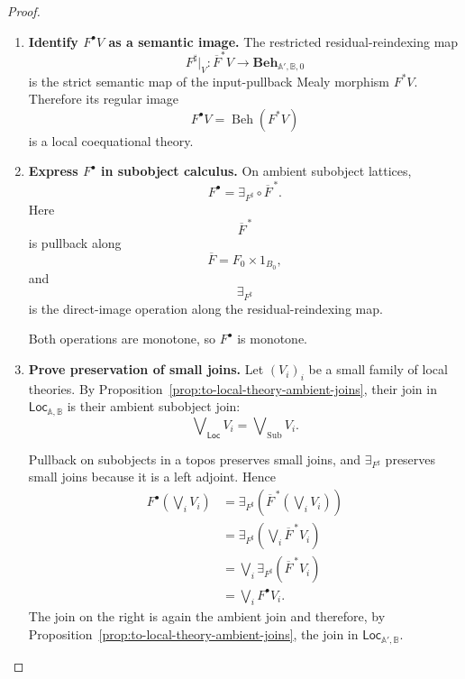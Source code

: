 \begin{proof}
    \leavevmode
    \begin{enumerate}
        \item \textbf{Identify \(F^\bullet V\) as a semantic image.}
        The restricted residual-reindexing map
        \[
            F^\sharp|_V:
            \overline F^*V
            \to
            \mathbf{Beh}_{\mathbb A',\mathbb B,0}
        \]
        is the strict semantic map of the input-pullback Mealy morphism
        \(F^*V\). Therefore its regular image
        \[
            F^\bullet V
            =
            \operatorname{Beh}(F^*V)
        \]
        is a local coequational theory.

        \item \textbf{Express \(F^\bullet\) in subobject calculus.}
        On ambient subobject lattices,
        \[
            F^\bullet
            =
            \exists_{F^\sharp}
            \circ
            \overline F^{\,*}.
        \]
        Here
        \[
            \overline F^{\,*}
        \]
        is pullback along
        \[
            \overline F
            =
            F_0\times1_{B_0},
        \]
        and
        \[
            \exists_{F^\sharp}
        \]
        is the direct-image operation along the residual-reindexing map.

        Both operations are monotone, so \(F^\bullet\) is monotone.

        \item \textbf{Prove preservation of small joins.}
        Let \((V_i)_i\) be a small family of local theories. By
        Proposition~\ref{prop:to-local-theory-ambient-joins}, their join in
        \(\mathsf{Loc}_{\mathbb A,\mathbb B}\) is their ambient subobject
        join:
        \[
            \bigvee\nolimits_{\mathsf{Loc}}V_i
            =
            \bigvee\nolimits_{\operatorname{Sub}}V_i.
        \]

        Pullback on subobjects in a topos preserves small joins, and
        \(\exists_{F^\sharp}\) preserves small joins because it is a left
        adjoint. Hence
        \[
        \begin{aligned}
            F^\bullet
            \left(
                \bigvee_iV_i
            \right)
            &=
            \exists_{F^\sharp}
            \left(
                \overline F^{\,*}
                \left(
                    \bigvee_iV_i
                \right)
            \right)
            \\
            &=
            \exists_{F^\sharp}
            \left(
                \bigvee_i
                \overline F^{\,*}V_i
            \right)
            \\
            &=
            \bigvee_i
            \exists_{F^\sharp}
            \left(
                \overline F^{\,*}V_i
            \right)
            \\
            &=
            \bigvee_iF^\bullet V_i.
        \end{aligned}
        \]
        The join on the right is again the ambient join and therefore, by
        Proposition~\ref{prop:to-local-theory-ambient-joins}, the join in
        \(\mathsf{Loc}_{\mathbb A',\mathbb B}\).


\end{enumerate}
\end{proof}
